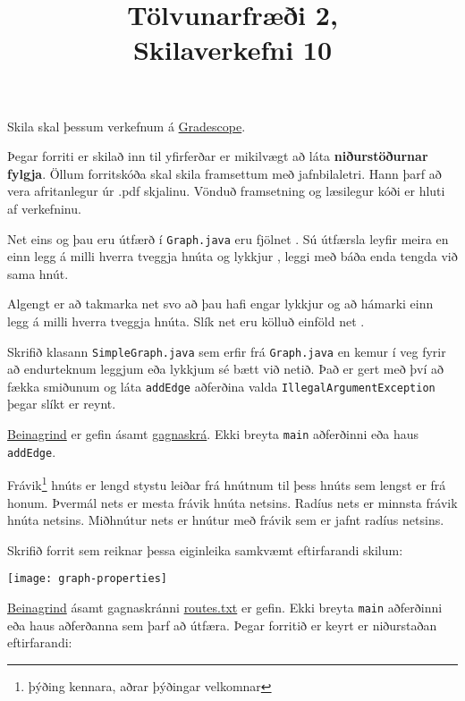 \documentclass{article}
\title{Tölvunarfræði 2, \semester \\ Skilaverkefni 10}
\author{}
\begin{document}
\maketitle
{}

Skila skal þessum verkefnum á \href{https://gradescope.com/courses/14122}{Gradescope}.

Þegar forriti er skilað inn til yfirferðar er mikilvægt að láta \textbf{niðurstöðurnar fylgja}. Öllum forritskóða skal skila framsettum með jafnbilaletri. Hann þarf að vera afritanlegur úr .pdf skjalinu. Vönduð framsetning og læsilegur kóði er hluti af verkefninu.

\question
Net eins og þau eru útfærð í \texttt{Graph.java} eru fjölnet . Sú útfærsla leyfir meira en einn legg á milli hverra tveggja hnúta og lykkjur , leggi með báða enda tengda við sama hnút.

Algengt er að takmarka net svo að þau hafi engar lykkjur og að hámarki einn legg á milli hverra tveggja hnúta. Slík net eru kölluð einföld net .

Skrifið klasann \texttt{SimpleGraph.java} sem erfir frá \texttt{Graph.java} en kemur í veg fyrir að endurteknum leggjum eða lykkjum sé bætt við netið. Það er gert með því að fækka smiðunum og láta \texttt{addEdge} aðferðina valda \texttt{IllegalArgumentException} þegar slíkt er reynt.

\href{https://raw.githubusercontent.com/Ernir/kennsluefni/master/T2/Code/w11/SimpleGraph.java}{Beinagrind} er gefin ásamt \href{https://github.com/Ernir/kennsluefni/tree/master/T2/Code/w11/tinyG.txt}{gagnaskrá}. Ekki breyta \texttt{main} aðferðinni eða haus \texttt{addEdge}. 

\question
Frávik\footnote{þýðing kennara, aðrar þýðingar velkomnar}  hnúts er lengd stystu leiðar frá hnútnum til þess hnúts sem lengst er frá honum. Þvermál  nets er mesta frávik hnúta netsins. Radíus  nets er minnsta frávik hnúta netsins. Miðhnútur  nets er hnútur með frávik sem er jafnt radíus netsins.

Skrifið forrit sem reiknar þessa eiginleika samkvæmt eftirfarandi skilum:

\begin{center}
\texttt{[image: graph-properties]}
\end{center}

\href{https://raw.githubusercontent.com/Ernir/kennsluefni/master/T2/Code/w11/GraphProperties.java}{Beinagrind} ásamt gagnaskránni \href{https://raw.githubusercontent.com/Ernir/kennsluefni/master/T2/Code/w11/routes.txt}{routes.txt} er gefin. Ekki breyta \texttt{main} aðferðinni eða haus aðferðanna sem þarf að útfæra. Þegar forritið er keyrt er niðurstaðan eftirfarandi:
\end{document}
